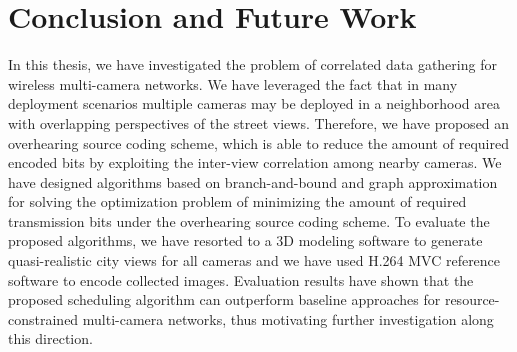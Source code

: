 \section{Conclusion and Future Work}
\label{sec::conclusion}
In this thesis, we have investigated the problem of correlated data gathering for wireless multi-camera networks.
We have leveraged the fact that in many deployment scenarios multiple cameras may be deployed in a neighborhood area with overlapping perspectives of the street views.
Therefore, we have proposed an overhearing source coding scheme, which is able to reduce the amount of required encoded bits by exploiting the inter-view correlation among nearby cameras. 
We have designed algorithms based on branch-and-bound and graph approximation for solving the optimization problem of minimizing the amount of required transmission bits under the overhearing source coding scheme.
To evaluate the proposed algorithms, we have resorted to a 3D modeling software to generate quasi-realistic city views for all cameras and we have used H.264 MVC reference software to encode collected images.
Evaluation results have shown that the proposed scheduling algorithm can outperform baseline approaches for resource-constrained multi-camera networks, thus motivating further investigation along this direction.